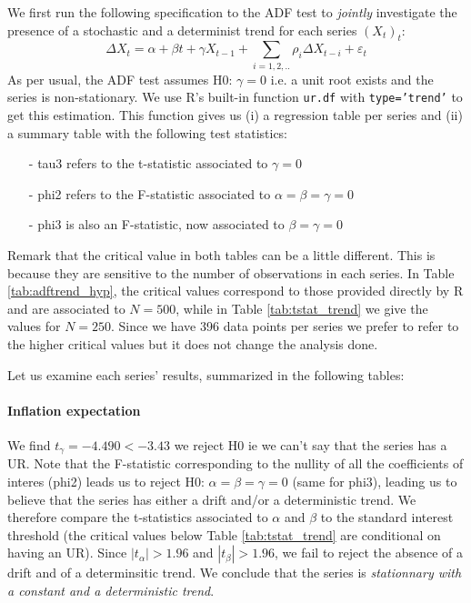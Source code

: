 \documentclass[hidelinks,12pts]{article}
\DeclareMathOperator{\1}{\mathbbm{1}}
\begin{document}
We first run the following specification to the ADF test to \emph{jointly} investigate the presence of a stochastic and a determinist trend for each series $(X_t)_t$: 
    \begin{equation}
        \Delta X_t = \alpha + \beta t + \gamma X_{t-1} +\sum_{i=1,2,..}\rho_i \Delta X_{t-i} + \varepsilon_t
    \end{equation}
As per usual, the ADF test assumes H0: $\gamma =0$ i.e. a unit root exists and the series is non-stationary.
We use R's built-in function \texttt{ur.df} with \texttt{type='trend'} to get this estimation. This function gives us (i) a regression table per series and (ii) a summary table with the following test statistics: 
    \begin{itemize}
        \item[-] tau3 refers to the t-statistic associated to $\gamma =0$ 
        \item[-] phi2 refers to the F-statistic associated to $\alpha = \beta = \gamma =0$
        \item[-] phi3 is also an F-statistic, now associated to $\beta =\gamma = 0$  
    \end{itemize}
Remark that the critical value in both tables can be a little different. This is because they are sensitive to the number of observations in each series. In Table \ref{tab:adftrend_hyp}, the critical values correspond to those provided directly by R and are associated to $N=500$, while in Table \ref{tab:tstat_trend} we give the values for $N=250$. Since we have 396 data points per series we prefer to refer to the higher critical values but it does not change the analysis done.

Let us examine each series' results, summarized in the following tables: 


%



\paragraph{Inflation expectation} 
We find $t_\gamma = -4.490 < -3.43$ we reject H0 ie we can't say that the series has a UR. 
Note that the F-statistic corresponding to the nullity of all the coefficients of interes (phi2) leads us to reject H0: $\alpha=\beta=\gamma=0$ (same for phi3), leading us to believe that the series has either a drift and/or a deterministic trend. 
We therefore compare the t-statistics associated to $\alpha$ and $\beta$ to the standard interest threshold (the critical values below Table \ref{tab:tstat_trend} are conditional on having an UR). Since $|t_\alpha|> 1.96$ and $|t_\beta| > 1.96$, we fail to reject the absence of a drift and of a determinsitic trend.
We conclude that the series is \emph{stationnary with a constant and a deterministic trend}.
    
\end{document}
